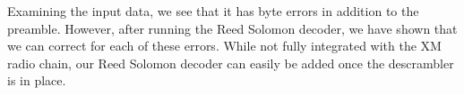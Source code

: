 \documentclass[conference,onecolumn]{IEEEtran}
\begin{document}
Examining the input data, we see that it has byte errors in addition to the preamble. However, after running the Reed Solomon decoder, we have shown that we can correct for each of these errors. While not fully integrated with the XM radio chain, our Reed Solomon decoder can easily be added once the descrambler is in place.

\printbibliography

\end{document}
